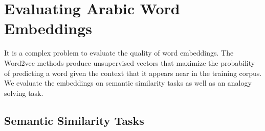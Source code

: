 \section{Evaluating Arabic Word Embeddings}
\label{sec:evaluation}


It is a complex problem to evaluate the quality of word embeddings. The Word2vec methods produce unsupervised vectors that maximize the probability of predicting a word given the context that it appears near in the training corpus. We evaluate the embeddings on semantic similarity tasks as well as an analogy solving task. 

\subsection{Semantic Similarity Tasks}

